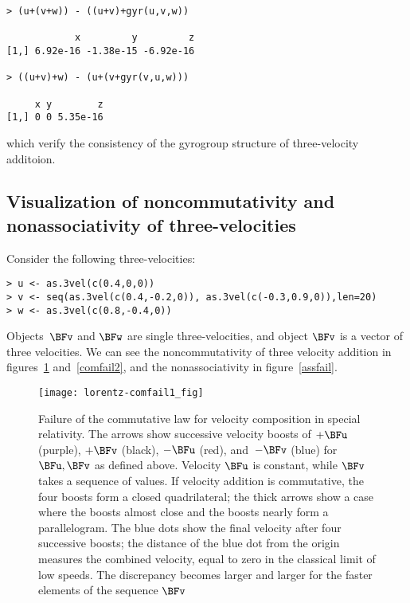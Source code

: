 \documentclass[ijoc,nonblindrev]{informs3} %
\begin{document}
\begin{verbatim}
> (u+(v+w)) - ((u+v)+gyr(u,v,w))

            x         y         z
[1,] 6.92e-16 -1.38e-15 -6.92e-16

> ((u+v)+w) - (u+(v+gyr(v,u,w)))

     x y        z
[1,] 0 0 5.35e-16

\end{verbatim}

which verify the consistency of the gyrogroup structure of
three-velocity additoion.


\subsection{Visualization of noncommutativity and nonassociativity of three-velocities}

Consider the following three-velocities:

\begin{verbatim}
> u <- as.3vel(c(0.4,0,0))
> v <- seq(as.3vel(c(0.4,-0.2,0)), as.3vel(c(-0.3,0.9,0)),len=20)
> w <- as.3vel(c(0.8,-0.4,0))

\end{verbatim}

Objects~$\BFv$ and $\BFw$ are single three-velocities, and object $\BFv$
 is a vector of three velocities.  We can see the noncommutativity of
 three velocity addition in figures~\ref{comfail1} and~\ref{comfail2},
 and the nonassociativity in figure~\ref{assfail}.

\begin{figure}[htbp]
  \begin{center}
\texttt{[image: lorentz-comfail1\_fig]}
\caption{Failure\label{comfail1} of the commutative law for velocity
  composition in special relativity.  The arrows show successive
  velocity boosts of $+\BFu$ (purple), $+\BFv$ (black), $-\BFu$ (red),
  and~$-\BFv$ (blue) for $\BFu,\BFv$ as defined above.  Velocity $\BFu$ is
  constant, while $\BFv$ takes a sequence of values.  If velocity
  addition is commutative, the four boosts form a closed
  quadrilateral; the thick arrows show a case where the boosts almost
  close and the boosts nearly form a parallelogram.  The blue dots
  show the final velocity after four successive boosts; the distance
  of the blue dot from the origin measures the combined velocity,
  equal to zero in the classical limit of low speeds.  The discrepancy
  becomes larger and larger for the faster elements of the sequence
  $\BFv$}
  \end{center}
\end{figure}
\end{document}
